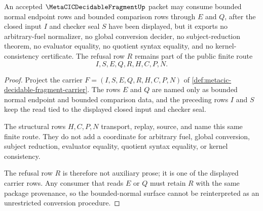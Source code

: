\begin{theorem}
\label{thm:metacic-decidable-fragment-bounded-normal-refusal}
An accepted $\MetaCICDecidableFragmentUp$ packet may consume bounded normal endpoint rows and bounded comparison rows through $E$ and $Q$, after the closed input $I$ and checker seal $S$ have been displayed, but it exports no arbitrary-fuel normalizer, no global conversion decider, no subject-reduction theorem, no evaluator equality, no quotient syntax equality, and no kernel-consistency certificate. The refusal row $R$ remains part of the public finite route
$$
I,S,E,Q,R,H,C,P,N .
$$
\end{theorem}
\begin{proof}
Project the carrier $F=(I,S,E,Q,R,H,C,P,N)$ of \autoref{def:metacic-decidable-fragment-carrier}. The rows $E$ and $Q$ are named only as bounded normal endpoint and bounded comparison data, and the preceding rows $I$ and $S$ keep the read tied to the displayed closed input and checker seal.

The structural rows $H,C,P,N$ transport, replay, source, and name this same finite route. They do not add a coordinate for arbitrary fuel, global conversion, subject reduction, evaluator equality, quotient syntax equality, or kernel consistency.

The refusal row $R$ is therefore not auxiliary prose; it is one of the displayed carrier rows. Any consumer that reads $E$ or $Q$ must retain $R$ with the same package provenance, so the bounded-normal surface cannot be reinterpreted as an unrestricted conversion procedure.
\end{proof}

